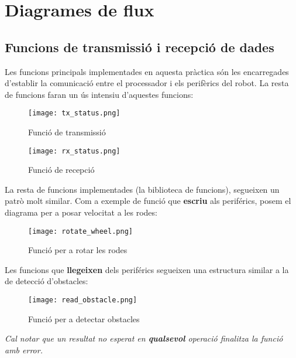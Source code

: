 \documentclass{../pdae} %
\begin{document}
\section{Diagrames de flux}

\subsection{Funcions de transmissió i recepció de dades}

Les funcions principals implementades en aquesta pràctica són les encarregades d'establir la comunicació entre el processador i els perifèrics del robot. La resta de funcions faran un ús intensiu d'aquestes funcions:

\begin{figure}[h]
  \centering
  \texttt{[image: tx\_status.png]}
  \caption{Funció de transmissió}
  \label{fig:tx}
\end{figure}

\begin{figure}[h]
  \centering
  \texttt{[image: rx\_status.png]}
  \caption{Funció de recepció}
  \label{fig:rx}
\end{figure}

La resta de funcions implementades (la biblioteca de funcions), segueixen un patrò molt similar. Com a exemple de funció que \textbf{escriu} als periférics, posem el diagrama per a posar velocitat a les rodes:

\begin{figure}[h]
  \centering
  \texttt{[image: rotate\_wheel.png]}
  \caption{Funció per a rotar les rodes}
  \label{fig:wheel}
\end{figure}

Les funcions que \textbf{llegeixen} dels periférics segueixen una estructura similar a la de detecció d'obstacles:

\begin{figure}[h]
  \centering
  \texttt{[image: read\_obstacle.png]}
  \caption{Funció per a detectar obstacles}
  \label{fig:obstacle}
\end{figure}

\textit{Cal notar que un resultat no esperat en \textbf{qualsevol} operació finalitza la funció amb error.}
\end{document}
